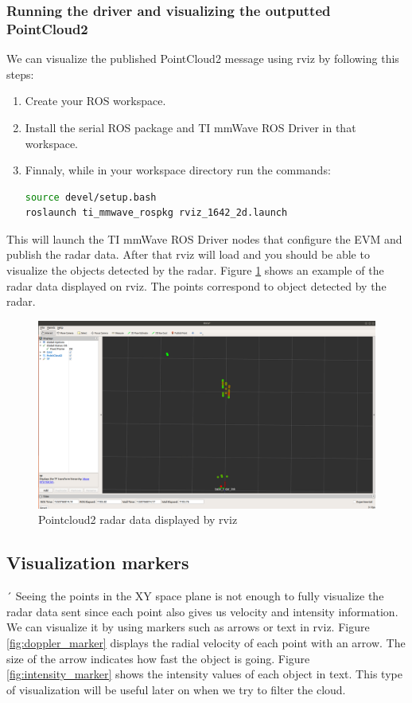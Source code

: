 \documentclass[12pt]{article}
\begin{document}
\subsubsection{Running the driver and visualizing the outputted PointCloud2}
We can visualize the published PointCloud2 message using rviz by following this steps:
\begin{enumerate}
    \item Create your ROS workspace.
    \item Install the serial ROS package and TI mmWave ROS Driver in that workspace.
    \item  Finnaly, while in your workspace directory run the commands:
    \begin{lstlisting}[language=bash]
source devel/setup.bash
roslaunch ti_mmwave_rospkg rviz_1642_2d.launch
\end{lstlisting}
\end{enumerate}
This will launch the TI mmWave ROS Driver nodes that configure the EVM and publish the radar data. After that rviz will load and you should be able to visualize the objects detected by the radar. Figure \ref{fig:radar_rviz} shows an example of the radar data displayed on rviz. The points correspond to object detected by the radar.
\begin{figure}[!htb]
    \centering
    \includegraphics[scale=0.2]{pc_not_filt.png}
    \caption{Pointcloud2 radar data displayed by rviz}
    \label{fig:radar_rviz}
\end{figure}
\subsection{Visualization markers}´
Seeing the points in the XY space plane is not enough to fully visualize the radar data sent since each point also gives us velocity and intensity information.
We can visualize it by using markers such as arrows or text in rviz.
Figure \ref{fig:doppler_marker} displays the radial velocity of each point with an arrow. The size of the arrow indicates how fast the object is going. Figure \ref{fig:intensity_marker} shows the intensity values of each object in text. This type of visualization will be useful later on when we try to filter the cloud.
\end{document}

